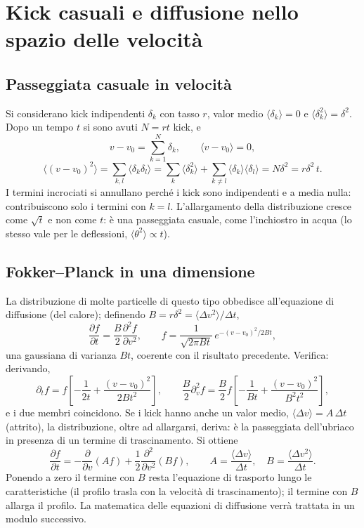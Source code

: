 \section{Kick casuali e diffusione nello spazio delle velocità}
\subsection{Passeggiata casuale in velocità}
Si considerano kick indipendenti $\delta_k$ con tasso $r$, valor medio $\langle\delta_k\rangle=0$ e $\langle\delta_k^2\rangle=\delta^2$. Dopo un tempo $t$ si sono avuti $N=rt$ kick, e
\begin{equation}
v-v_0=\sum_{k=1}^N\delta_k,\qquad\langle v-v_0\rangle=0,
\end{equation}
\begin{equation}
\langle(v-v_0)^2\rangle=\sum_{k,l}\langle\delta_k\delta_l\rangle=\sum_k\langle\delta_k^2\rangle+\sum_{k\neq l}\langle\delta_k\rangle\langle\delta_l\rangle=N\delta^2=r\delta^2\,t.
\end{equation}
I termini incrociati si annullano perché i kick sono indipendenti e a media nulla: contribuiscono solo i termini con $k=l$. L'allargamento della distribuzione cresce come $\sqrt{t}$ e non come $t$: è una passeggiata casuale, come l'inchiostro in acqua (lo stesso vale per le deflessioni, $\langle\theta^2\rangle\propto t$).

\subsection{Fokker--Planck in una dimensione}
La distribuzione di molte particelle di questo tipo obbedisce all'equazione di diffusione (del calore); definendo $B=r\delta^2=\langle\Delta v^2\rangle/\Delta t$,
\begin{equation}
\frac{\partial f}{\partial t}=\frac{B}{2}\frac{\partial^2f}{\partial v^2},\qquad f=\frac{1}{\sqrt{2\pi Bt}}\,e^{-(v-v_0)^2/2Bt},
\end{equation}
una gaussiana di varianza $Bt$, coerente con il risultato precedente. Verifica: derivando,
\begin{equation}
\partial_tf=f\left[-\frac{1}{2t}+\frac{(v-v_0)^2}{2Bt^2}\right],\qquad \frac{B}{2}\partial_v^2f=\frac{B}{2}f\left[-\frac{1}{Bt}+\frac{(v-v_0)^2}{B^2t^2}\right],
\end{equation}
e i due membri coincidono.
Se i kick hanno anche un valor medio, $\langle\Delta v\rangle=A\,\Delta t$ (attrito), la distribuzione, oltre ad allargarsi, deriva: è la passeggiata dell'ubriaco in presenza di un termine di trascinamento. Si ottiene
\begin{equation}
\frac{\partial f}{\partial t}=-\frac{\partial}{\partial v}(Af)+\frac12\frac{\partial^2}{\partial v^2}(Bf),\qquad A=\frac{\langle\Delta v\rangle}{\Delta t},\quad B=\frac{\langle\Delta v^2\rangle}{\Delta t}.
\end{equation}
Ponendo a zero il termine con $B$ resta l'equazione di trasporto lungo le caratteristiche (il profilo trasla con la velocità di trascinamento); il termine con $B$ allarga il profilo. La matematica delle equazioni di diffusione verrà trattata in un modulo successivo.

